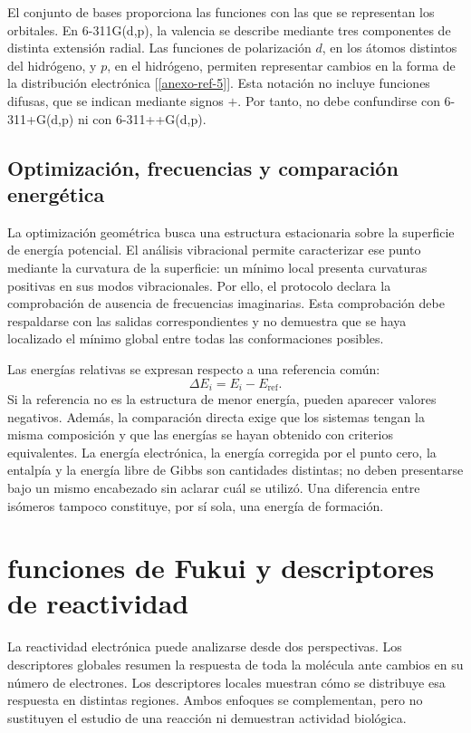 El conjunto de bases proporciona las funciones con las que se representan los orbitales. En 6-311G(d,p), la valencia se describe mediante tres componentes de distinta extensión radial. Las funciones de polarización $d$, en los átomos distintos del hidrógeno, y $p$, en el hidrógeno, permiten representar cambios en la forma de la distribución electrónica [\ref{anexo-ref-5}]. Esta notación no incluye funciones difusas, que se indican mediante signos $+$. Por tanto, no debe confundirse con 6-311+G(d,p) ni con 6-311++G(d,p).

\section{Optimización, frecuencias y comparación energética}
La optimización geométrica busca una estructura estacionaria sobre la superficie de energía potencial. El análisis vibracional permite caracterizar ese punto mediante la curvatura de la superficie: un mínimo local presenta curvaturas positivas en sus modos vibracionales. Por ello, el protocolo declara la comprobación de ausencia de frecuencias imaginarias. Esta comprobación debe respaldarse con las salidas correspondientes y no demuestra que se haya localizado el mínimo global entre todas las conformaciones posibles.

Las energías relativas se expresan respecto a una referencia común:
\begin{equation}
 \Delta E_i=E_i-E_{\mathrm{ref}}.
\end{equation}
Si la referencia no es la estructura de menor energía, pueden aparecer valores negativos. Además, la comparación directa exige que los sistemas tengan la misma composición y que las energías se hayan obtenido con criterios equivalentes. La energía electrónica, la energía corregida por el punto cero, la entalpía y la energía libre de Gibbs son cantidades distintas; no deben presentarse bajo un mismo encabezado sin aclarar cuál se utilizó. Una diferencia entre isómeros tampoco constituye, por sí sola, una energía de formación.

\chapter{funciones de Fukui y descriptores de reactividad}
\label{ap:reactividad}

La reactividad electrónica puede analizarse desde dos perspectivas. Los descriptores globales resumen la respuesta de toda la molécula ante cambios en su número de electrones. Los descriptores locales muestran cómo se distribuye esa respuesta en distintas regiones. Ambos enfoques se complementan, pero no sustituyen el estudio de una reacción ni demuestran actividad biológica.

